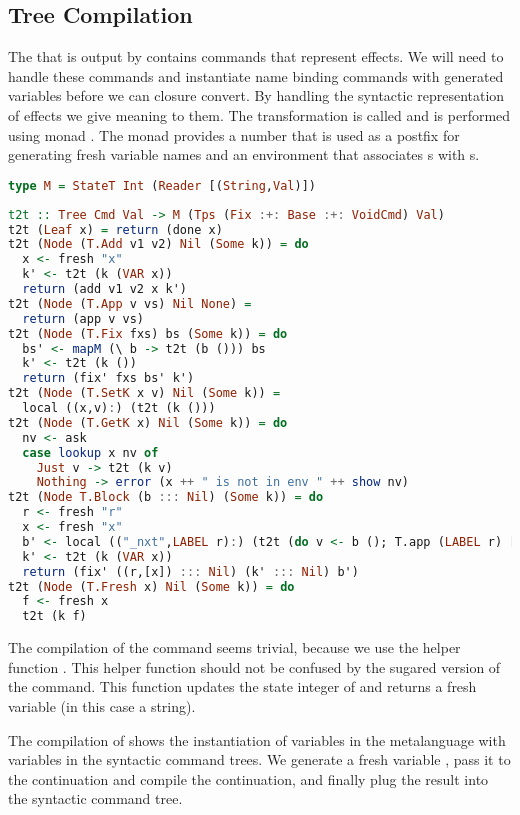 \subsection{\label{subsection:semtosyn}Tree Compilation}
The  that is output by  contains commands that represent effects. We will need to handle these commands and instantiate name binding commands with generated variables before we can closure convert. By handling the syntactic representation of effects we give meaning to them. The transformation is called  and is performed using monad . The monad  provides a number that is used as a postfix for generating fresh variable names and an environment that associates s with s.

\begin{lstlisting}[language=Haskell]
type M = StateT Int (Reader [(String,Val)])
\end{lstlisting}

\begin{lstlisting}[language=Haskell]
t2t :: Tree Cmd Val -> M (Tps (Fix :+: Base :+: VoidCmd) Val)
t2t (Leaf x) = return (done x)
t2t (Node (T.Add v1 v2) Nil (Some k)) = do
  x <- fresh "x"
  k' <- t2t (k (VAR x))
  return (add v1 v2 x k')
t2t (Node (T.App v vs) Nil None) =
  return (app v vs)
t2t (Node (T.Fix fxs) bs (Some k)) = do
  bs' <- mapM (\ b -> t2t (b ())) bs
  k' <- t2t (k ())
  return (fix' fxs bs' k')
t2t (Node (T.SetK x v) Nil (Some k)) =
  local ((x,v):) (t2t (k ()))
t2t (Node (T.GetK x) Nil (Some k)) = do
  nv <- ask
  case lookup x nv of
    Just v -> t2t (k v)
    Nothing -> error (x ++ " is not in env " ++ show nv)
t2t (Node T.Block (b ::: Nil) (Some k)) = do
  r <- fresh "r"
  x <- fresh "x"
  b' <- local (("_nxt",LABEL r):) (t2t (do v <- b (); T.app (LABEL r) [v]))
  k' <- t2t (k (VAR x))
  return (fix' ((r,[x]) ::: Nil) (k' ::: Nil) b')
t2t (Node (T.Fresh x) Nil (Some k)) = do
  f <- fresh x
  t2t (k f)
\end{lstlisting}

The compilation of the  command seems trivial, because we use the helper function . This helper function should not be confused by the sugared version of the  command. This function updates the state integer of  and returns a fresh variable (in this case a string).

The compilation of  shows the instantiation of variables in the metalanguage with variables in the syntactic command trees. We generate a fresh variable , pass it to the continuation and compile the continuation, and finally plug the result into the syntactic command tree.

